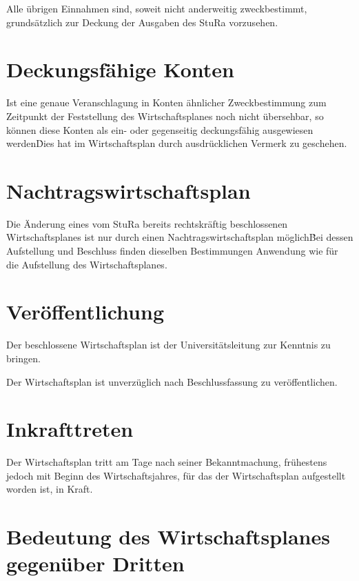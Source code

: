 \Abs \Satz Alle übrigen Einnahmen sind, soweit nicht anderweitig zweckbestimmt, grundsätzlich zur Deckung der Ausgaben des StuRa vorzusehen.



\section{Deckungsfähige Konten}

\Abs \Satz Ist eine genaue Veranschlagung in Konten ähnlicher Zweckbestimmung zum Zeitpunkt der Feststellung des Wirtschaftsplanes noch nicht übersehbar, so können diese Konten als ein- oder gegenseitig deckungsfähig ausgewiesen werden\. Dies hat im Wirtschaftsplan durch ausdrücklichen Vermerk zu geschehen.



\section{Nachtragswirtschaftsplan}

\Abs \Satz Die Änderung eines vom StuRa bereits rechtskräftig beschlossenen Wirtschaftsplanes ist nur durch einen Nachtragswirtschaftsplan möglich\. Bei dessen Aufstellung und Beschluss finden dieselben Bestimmungen Anwendung wie für die Aufstellung des Wirtschaftsplanes.



\section{Veröffentlichung}

\Abs \Satz Der beschlossene Wirtschaftsplan ist der Universitätsleitung zur Kenntnis zu bringen.

\Abs \Satz Der Wirtschaftsplan ist unverzüglich nach Beschlussfassung zu veröffentlichen.



\section{Inkrafttreten}

\Abs \Satz Der Wirtschaftsplan tritt am Tage nach seiner Bekanntmachung, frühestens jedoch mit Beginn des Wirtschaftsjahres, für das der Wirtschaftsplan aufgestellt worden ist, in Kraft.



\section{Bedeutung des Wirtschaftsplanes gegenüber Dritten}

